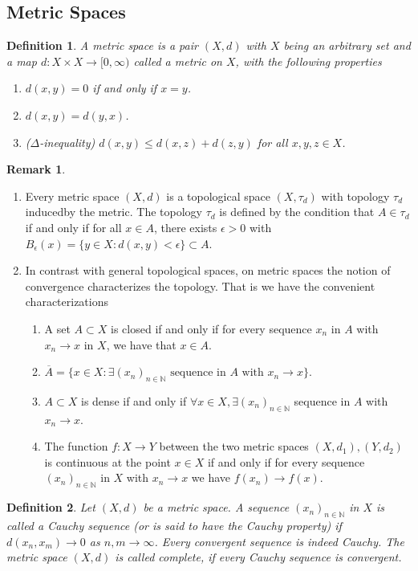 \documentclass[11pt,a4paper]{article}
\newtheorem{defn}{Definition}[section]
\theoremstyle{definition}
\newtheorem{rem}{Remark}[section]
\begin{document}
\subsection{Metric Spaces}
\begin{defn} A metric space is a pair $(X,d)$ with $X$ being an arbitrary set and a map $d: X \times X \to [0, \infty)$ called a metric on $X$, with the following properties
\begin{enumerate}
\item $d(x,y)=0$ if and only if $x=y$.
\item $d(x,y)=d(y,x)$.
\item ($\Delta$-inequality) $d(x,y) \leq d(x,z) + d(z,y)$ for all $x,y,z \in X$. 
\end{enumerate}
\end{defn}
\begin{rem} \
\begin{enumerate}
\item Every metric space $(X,d)$ is a topological space $(X, \tau_d)$ with topology $\tau_d$ inducedby the metric. The topology $\tau_d$ is defined by the condition that $A \in \tau_d$ if and only if for all $x \in A$, there exists $\epsilon >0$ with $B_\epsilon(x)= \lbrace y \in X : d(x,y) < \epsilon \rbrace \subset A$. 
\item In contrast with general topological spaces, on metric spaces the notion of convergence characterizes the topology. That is we have the convenient characterizations
\begin{enumerate}
\item A set $A\subset X$ is closed if and only if for every sequence $x_n$ in $A$ with $x_n \to x$ in $X$, we have that $x \in A$. 
\item $\overline{A}= \lbrace x \in X : \exists (x_n)_{n \in \mathbb{N}} \text{ sequence in $A$ with } x_n \to x \rbrace $. 
\item $A \subset X$ is dense if and only if $\forall x \in X, \exists (x_n)_{n \in \mathbb{N}}$ sequence in $A$ with $x_n \to x$. 
\item The function $f: X \to Y$ between the two metric spaces $(X,d_1), (Y,d_2)$ is continuous at the point $x \in X$ if and only if for every sequence $(x_n)_{n \in \mathbb{N}}$ in $X$ with $x_n \to x$ we have $f(x_n) \to f(x)$. 
\end{enumerate}
\end{enumerate}
\end{rem}
\newpage
\begin{defn} Let $(X,d)$ be a metric space. A sequence $(x_n)_{n \in \mathbb{N}}$ in $X$ is called a Cauchy sequence (or is said to have the Cauchy property) if $d(x_n,x_m) \to 0$ as $n,m \to \infty$. Every convergent sequence is indeed Cauchy. The metric space $(X,d)$ is called complete, if every Cauchy sequence is convergent. 
\end{defn}
\end{document}

